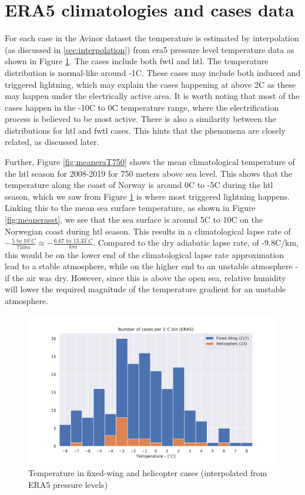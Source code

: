 \section{ERA5 climatologies and cases data}\label{sec:era5results}
For each case in the Avinor dataset the temperature is estimated by interpolation (as discussed in \ref{sec:interpolation}) from \acrshort{era5} pressure level temperature data as shown in Figure \ref{fig:temperatureera5}. The cases include both \acrshort{fwtl} and \acrshort{htl}. The temperature distribution is normal-like around -1C. These cases may include both induced and triggered lightning, which may explain the cases happening at above 2C as these may happen under the electrically active area. It is worth noting that most of the cases happen in the -10C to 0C temperature range, where the electrification process is believed to be most active. There is also a similarity between the distributions for \acrshort{htl} and \acrshort{fwtl} cases. This hints that the phenomena are closely related, as discussed later.

Further, Figure \ref{fig:meaneraT750} shows the mean climatological temperature of the \acrshort{htl} season for 2008-2019 for 750 meters above sea level. This shows that the temperature along the coast of Norway is around 0C to -5C during the \acrshort{htl} season, which we saw from Figure \ref{fig:temperatureera5} is where most triggered lightning happens. Linking this to the mean sea surface temperature, as shown in Figure \ref{fig:meanerasst}, we see that the sea surface is around 5C to 10C on the Norwegian coast during \acrshort{htl} season. This results in a climatological lapse rate of $-\frac{5 \text{ to } 10 ^{\circ}C}{750m} \approx -\frac{6.67 \text{ to }13.33 ^{\circ}C}{km}$. Compared to the dry adiabatic lapse rate, of -9.8C/km, this would be on the lower end of the climatological lapse rate approximation lead to a stable atmosphere, while on the higher end to an unstable atmosphere - if the air was dry. However, since this is above the open sea, relative humidity will lower the required magnitude of the temperature gradient for an unstable atmosphere. 

\begin{figure}
    \centering
    \includegraphics[width=\textwidth]{Figures/temperature.pdf}
    \caption{Temperature in fixed-wing and helicopter cases (interpolated from ERA5 pressure levels)}
    \label{fig:temperatureera5}
\end{figure}

